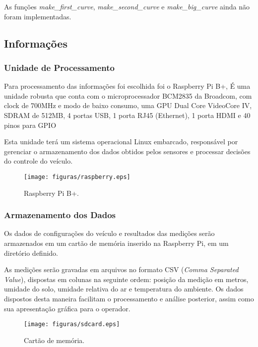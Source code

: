   As funções \textit{make\_first\_curve}, \textit{make\_second\_curve} e \textit{make\_big\_curve} ainda não
  foram implementadas.

  \subsection{Informações}

  \subsubsection{Unidade de Processamento}

  Para processamento das informações foi
  escolhida foi o Raspberry Pi B+,
  É uma unidade robusta que conta com o microprocessador
  BCM2835 da Broadcom, com clock de
  700MHz e modo de baixo consumo, uma GPU Dual Core VideoCore
  IV\textregistered, SDRAM de 512MB, 4 portas USB, 1 porta RJ45
  (Ethernet), 1 porta HDMI e 40 pinos para GPIO~\cite{raspref}

  Esta unidade terá um sistema operacional Linux embarcado, responsável
  por gerenciar o armazenamento dos dados obtidos pelos sensores e
  processar decisões do controle do veículo.

  \begin{figure}[!htbp]
  \begin{center}
  \texttt{[image: figuras/raspberry.eps]}
  \caption{\label{fig:raspberry}Raspberry Pi B+.}
  \end{center}
  \end{figure}

  \subsubsection{Armazenamento dos Dados}
  Os dados de configurações do veículo e resultados das medições serão armazenados
  em um cartão de memória inserido na Raspberry Pi, em um diretório definido.

  As medições serão gravadas em arquivos no formato CSV (\textit{Comma Separated Value}),
  dispostas em colunas na seguinte ordem: posição da medição
  em metros, umidade do solo, umidade relativa do ar e temperatura do
  ambiente.
  Os dados dispostos desta maneira facilitam o processamento e
  análise posterior, assim como sua apresentação gráfica para
  o operador.

  \begin{figure}[!htbp]
  \begin{center}
  \texttt{[image: figuras/sdcard.eps]}
  \caption{\label{fig:sdcard}Cartão de memória.}
  \end{center}
  \end{figure}

